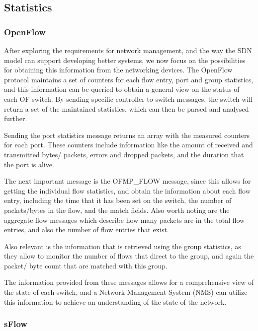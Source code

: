 \begin {enumerate}
\begin{enumerate}
\subsection {Statistics}

\subsubsection {OpenFlow}

After exploring the requirements for network management, and the way the SDN model can support developing better systems, we now focus on the possibilities for
obtaining this information from the networking devices. The OpenFlow protocol maintains a set of counters for each flow entry, port and group statistics, and this
information can be queried to obtain a general view on the status of each OF switch. By sending specific controller-to-switch messages, the switch will return a set
of the maintained statistics, which can then be parsed and analysed further. 

\par Sending the port statistics message returns an array with the measured counters for each port. These counters include information like the amount of received
and transmitted bytes/ packets, errors and dropped packets, and the duration that the port is alive. 

\par The next important message is the \textsc{OFMP\_FLOW} message, since this allows for getting the individual flow statistics, and obtain the information about
each flow entry, including the time that it has been set on the switch, the number of packets/bytes in the flow, and the match fields. Also worth noting are the 
aggregate flow messages which describe how many packets are in the total flow entries, and also the number of flow entries that exist.

\par Also relevant is the information that is retrieved using the group statistics, as they allow to monitor the number of flows that direct to the group, and again
the packet/ byte count that are matched with this group.

\par The information provided from these messages allows for a comprehensive view of the state of each switch, and a Network Management System (NMS) can utilize
this information to achieve an understanding of the state of the network. 

\subsubsection {sFlow} \label{sec:sflow}


\end{enumerate}
\end{enumerate}
